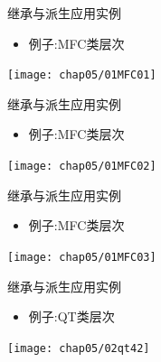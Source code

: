 \begin{frame}[t, fragile]{继承与派生}{应用实例}%
  \begin{itemize}
  \item 例子:MFC类层次
  \end{itemize}
  \begin{center}
    \texttt{[image: chap05/01MFC01]}
  \end{center}
\end{frame}

\begin{frame}[t, fragile]{继承与派生}{应用实例}%
  \begin{itemize}
  \item 例子:MFC类层次
  \end{itemize}
  \begin{center}
    \texttt{[image: chap05/01MFC02]}
  \end{center}
\end{frame}

\begin{frame}[t, fragile]{继承与派生}{应用实例}%
  \begin{itemize}
  \item 例子:MFC类层次
  \end{itemize}
  \begin{center}
    \texttt{[image: chap05/01MFC03]}
  \end{center}
\end{frame}

\begin{frame}[t, fragile]{继承与派生}{应用实例}%
  \begin{itemize}
  \item 例子:QT类层次
  \end{itemize}
  \begin{center}
    \texttt{[image: chap05/02qt42]}
  \end{center}
\end{frame}

